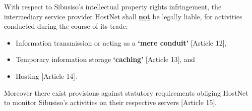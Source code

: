 \documentclass[11pt]{article}
\begin{document}
With respect to Sibusiso's intellectual property rights infringement, the
intermediary service provider HostNet shall \uline{\textbf{not}} be legally liable, for
activities conducted during the course of its trade:
\begin{itemize}
\item Information transmission or acting as a \textbf{`mere conduit'} [Article 12]\cite{eurlex00_elec_commerce},
\item Temporary information storage \textbf{`caching'} [Article 13]\cite{eurlex00_elec_commerce}, and
\item Hosting [Article 14]\cite{eurlex00_elec_commerce}.
\end{itemize}

Moreover there exist provisions against statutory requirements obliging HostNet
to monitor Sibusiso's activities on their respective servers [Article 15]\cite{eurlex00_elec_commerce}.

\printbibliography
\end{document}
